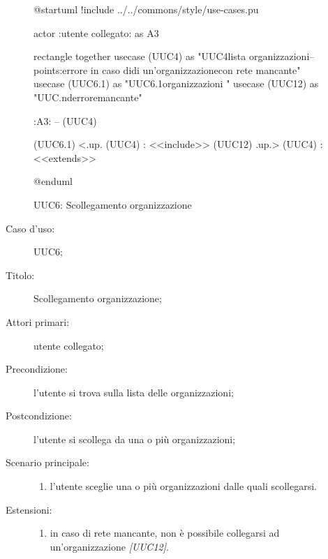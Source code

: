 \documentclass[../../../analisi-dei-requisiti.tex]{subfiles}
\begin{document}
\begin{figure}[H]
  \centering
  \begin{plantuml}
  @startuml
  !include ../../commons/style/use-cases.pu

  actor :utente collegato: as A3

  rectangle {
    together {
      usecase (UUC4) as "UUC4\nRecupero lista organizzazioni\n--\nExtension points:\nVisualizzazione errore in caso di\nselezionamento di un'organizzazione\n con rete mancante"
      usecase (UUC6.1) as "UUC6.1\nFiltra organizzazioni \ncollegato"
      usecase (UUC12) as "UUC.nd\nVisualizzazione errore\nrete mancante"
    }
  }

  :A3: -- (UUC4)

  (UUC6.1) <.up. (UUC4) : <<include>>
  (UUC12) .up.> (UUC4) : <<extends>>

  @enduml
  \end{plantuml}
  \caption{UUC6: Scollegamento organizzazione}%
  \label{fig:UUC12}
\end{figure}

\begin{description}
  \item[Caso d’uso:] UUC6;
  \item[Titolo:] Scollegamento organizzazione;
  \item[Attori primari:] utente collegato;
  \item[Precondizione:] l'utente si trova sulla lista delle organizzazioni;
  \item[Postcondizione:] l'utente si scollega da una o più organizzazioni;
  \item[Scenario principale:]
        \begin{enumerate}
          \item l'utente sceglie una o più organizzazioni dalle quali scollegarsi.
        \end{enumerate}
  \item[Estensioni:]
        \begin{enumerate}
          \item in caso di rete mancante, non è possibile collegarsi ad un'organizzazione \emph{[UUC12]}.
        \end{enumerate}
\end{description}
\end{document}
